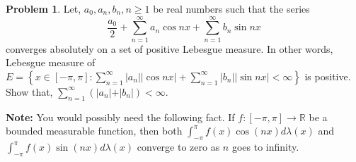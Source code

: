 \documentclass[12pt]{article}
\newcommand{\R}{\mathbb{R}}
\theoremstyle{definition}
\newtheorem*{prb}{Problem}
\newenvironment{problem}{
\begin{tcolorbox}[colback=blue!5!white,colframe=blue!75!black, parbox = true] \begin{prb}  }{\end{prb}\end{tcolorbox} }
\begin{document}
\begin{problem}
	Let, $a_0, a_n, b_n, n \geq 1$ be real numbers such that the series
	$$\dfrac{a_0}{2} + \sum_{n = 1}^{\infty} a_n \cos nx + \sum_{n = 1}^{\infty} b_n \sin nx$$
	converges absolutely on a set of positive Lebesgue measure. In other words, Lebesgue measure of $E = \left\{ x\in[-\pi, \pi] : \sum_{n=1}^{\infty} \vert a_n \vert \vert \cos nx \vert + \sum_{n=1}^{\infty} \vert b_n \vert \vert \sin nx \vert < \infty \right\}$ is positive. Show that, $\sum_{n=1}^{\infty} (\vert a_n \vert + \vert b_n \vert) < \infty$.

	\textbf{Note:} You would possibly need the following fact. If $f: [-\pi, \pi] \rightarrow \R$ be a bounded measurable function, then both $\int_{-\pi}^{\pi} f(x) \cos (nx) d\lambda(x)$ and $\int_{-\pi}^{\pi} f(x) \sin (nx) d\lambda(x)$ converge to zero as $n$ goes to infinity.
\end{problem}
\end{document}
